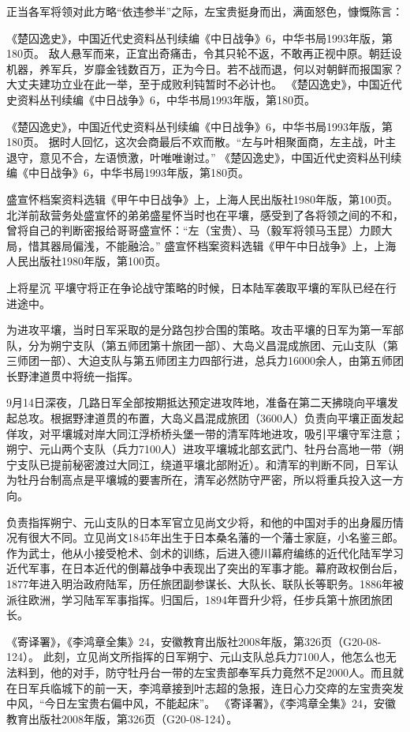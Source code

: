 \documentclass[12pt,UTF8]{ctexbook}
\begin{document}
正当各军将领对此方略“依违参半”之际，左宝贵挺身而出，满面怒色，慷慨陈言：

《楚囚逸史》，中国近代史资料丛刊续编《中日战争》6，中华书局1993年版，第180页。
敌人悬军而来，正宜出奇痛击，令其只轮不返，不敢再正视中原。朝廷设机器，养军兵，岁靡金钱数百万，正为今日。若不战而退，何以对朝鲜而报国家？大丈夫建功立业在此一举，至于成败利钝暂时不必计也。 《楚囚逸史》，中国近代史资料丛刊续编《中日战争》6，中华书局1993年版，第180页。

《楚囚逸史》，中国近代史资料丛刊续编《中日战争》6，中华书局1993年版，第180页。
据时人回忆，这次会商最后不欢而散。“左与叶相聚面商，左主战，叶主退守，意见不合，左语愤激，叶唯唯谢过。” 《楚囚逸史》，中国近代史资料丛刊续编《中日战争》6，中华书局1993年版，第180页。

盛宣怀档案资料选辑《甲午中日战争》上，上海人民出版社1980年版，第100页。
北洋前敌营务处盛宣怀的弟弟盛星怀当时也在平壤，感受到了各将领之间的不和，曾将自己的判断密报给哥哥盛宣怀：“左（宝贵）、马（毅军将领马玉昆）力顾大局，惜其器局偏浅，不能融洽。” 盛宣怀档案资料选辑《甲午中日战争》上，上海人民出版社1980年版，第100页。

上将星沉
平壤守将正在争论战守策略的时候，日本陆军袭取平壤的军队已经在行进途中。

为进攻平壤，当时日军采取的是分路包抄合围的策略。攻击平壤的日军为第一军部队，分为朔宁支队（第五师团第十旅团一部）、大岛义昌混成旅团、元山支队（第三师团一部）、大迫支队与第五师团主力四部行进，总兵力16000余人，由第五师团长野津道贯中将统一指挥。

9月14日深夜，几路日军全部按期抵达预定进攻阵地，准备在第二天拂晓向平壤发起总攻。根据野津道贯的布置，大岛义昌混成旅团（3600人）负责向平壤正面发起佯攻，对平壤城对岸大同江浮桥桥头堡一带的清军阵地进攻，吸引平壤守军注意；朔宁、元山两个支队（兵力7100人）进攻平壤城北部玄武门、牡丹台高地一带（朔宁支队已提前秘密渡过大同江，绕道平壤北部附近）。和清军的判断不同，日军认为牡丹台制高点是平壤城的要害所在，清军必然防守严密，所以将重兵投入这一方向。

负责指挥朔宁、元山支队的日本军官立见尚文少将，和他的中国对手的出身履历情况有很大不同。立见尚文1845年出生于日本桑名藩的一个藩士家庭，小名鉴三郎。作为武士，他从小接受枪术、剑术的训练，后进入德川幕府编练的近代化陆军学习近代军事，在日本近代的倒幕战争中表现出了突出的军事才能。幕府政权倒台后，1877年进入明治政府陆军，历任旅团副参谋长、大队长、联队长等职务。1886年被派往欧洲，学习陆军军事指挥。归国后，1894年晋升少将，任步兵第十旅团旅团长。

《寄译署》，《李鸿章全集》24，安徽教育出版社2008年版，第326页（G20-08-124）。
此刻，立见尚文所指挥的日军朔宁、元山支队总兵力7100人，他怎么也无法料到，他的对手，防守牡丹台一带的左宝贵部奉军兵力竟然不足2000人。而且就在日军兵临城下的前一天，李鸿章接到叶志超的急报，连日心力交瘁的左宝贵突发中风，“今日左宝贵右偏中风，不能起床”。 《寄译署》，《李鸿章全集》24，安徽教育出版社2008年版，第326页（G20-08-124）。
\end{document}
